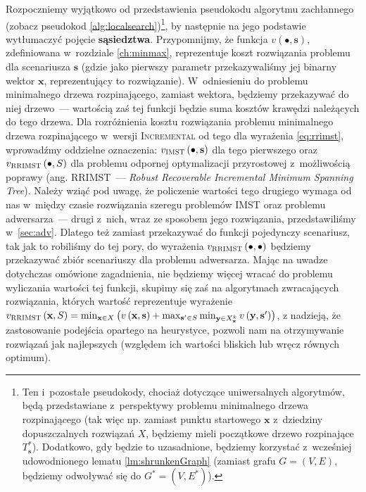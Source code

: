 Rozpoczniemy wyjątkowo od przedstawienia pseudokodu algorytmu zachłannego (zobacz pseudokod \ref{alg:localsearch})\footnote{
	Ten i~pozostałe pseudokody, chociaż dotyczące uniwersalnych algorytmów, będą przedstawiane z~perspektywy problemu minimalnego drzewa rozpinającego (tak więc np. zamiast punktu startowego $\textbf{x}$ z~dziedziny dopuszczalnych rozwiązań $X$, będziemy mieli początkowe drzewo rozpinające $T^{\ast}_{\textbf{s}}$).
	Dodatkowo, gdy będzie to uzasadnione, będziemy korzystać z~wcześniej udowodnionego lematu \ref{lm:shrunkenGraph} (zamiast grafu $G = \left( V, E \right)$, będziemy odwoływać się do $G^{\ast} = \left( V, E^{\ast} \right)$).
}, by następnie na jego podstawie wytłumaczyć pojęcie \textbf{sąsiedztwa}.
Przypomnijmy, że funkcja $v \left( \bullet, \textbf{s} \right)$, zdefiniowana w~rozdziale \ref{ch:minmax}, reprezentuje koszt rozwiązania problemu dla scenariusza $\textbf{s}$ (gdzie jako pierwszy parametr przekazywaliśmy jej binarny wektor $\textbf{x}$, reprezentujący to rozwiązanie).
W~odniesieniu do problemu minimalnego drzewa rozpinającego, zamiast wektora, będziemy przekazywać do niej drzewo~--- wartością zaś tej funkcji będzie suma kosztów krawędzi należących do tego drzewa.
Dla rozróżnienia kosztu rozwiązania problemu minimalnego drzewa rozpinającego w~wersji \textsc{Incremental} od tego dla wyrażenia \ref{eq:rrimst}, wprowadźmy oddzielne oznaczenia: $v_{\textsc{IMST}} \left( \bullet, \textbf{s} \right)$ dla tego pierwszego oraz $v_{\textsc{RRIMST}} \left( \bullet, S \right)$ dla problemu odpornej optymalizacji przyrostowej z~możliwością poprawy (ang. \textsc{RRIMST}~--- \textit{Robust Recoverable Incremental Minimum Spanning Tree}).
Należy wziąć pod uwagę, że policzenie wartości tego drugiego wymaga od nas w~między czasie rozwiązania szeregu problemów \textsc{IMST} oraz problemu adwersarza~--- drugi z~nich, wraz ze sposobem jego rozwiązania, przedstawiliśmy w~\ref{sec:adv}.
Dlatego też zamiast przekazywać do funkcji pojedynczy scenariusz, tak jak to robiliśmy do tej pory, do wyrażenia $v_{\textsc{RRIMST}} \left( \bullet, \bullet \right)$ będziemy przekazywać zbiór scenariuszy dla problemu adwersarza.
Mając na uwadze dotychczas omówione zagadnienia, nie będziemy więcej wracać do problemu wyliczania wartości tej funkcji, skupimy się zaś na algorytmach zwracających rozwiązania, których wartość reprezentuje wyrażenie $v_{\textsc{RRIMST}} \left( \textbf{x}, S \right) = \min_{\textbf{x} \in X} \left( v \left( \textbf{x}, \textbf{s} \right) + \max_{\textbf{s}^{\prime} \in S} \min_{\textbf{y} \in X^{k}_{\textbf{x}}} v \left( \textbf{y}, \textbf{s}^{\prime} \right) \right)$, z nadzieją, że zastosowanie podejścia opartego na heurystyce, pozwoli nam na otrzymywanie rozwiązań jak najlepszych (względem ich wartości bliskich lub wręcz równych optimum).

